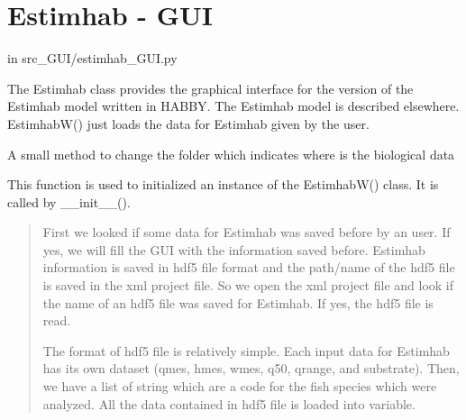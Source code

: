 \documentclass[letterpaper,10pt,english]{sphinxmanual}
\begin{document}
\section{Estimhab - GUI}
\label{\detokenize{index:estimhab-gui}}
in src\_GUI/estimhab\_GUI.py
\label{\detokenize{index:module-src_GUI.estimhab_GUI}}

\begin{fulllineitems}
\label{\detokenize{index:src_GUI.estimhab_GUI.EstimhabW}}
The Estimhab class provides the graphical interface for the version of the Estimhab model written in HABBY.
The Estimhab model is described elsewhere. EstimhabW() just loads the data for Estimhab given by the user.

\begin{fulllineitems}
\label{\detokenize{index:src_GUI.estimhab_GUI.EstimhabW.change_folder}}
A small method to change the folder which indicates where is the biological data

\end{fulllineitems}


\begin{fulllineitems}
\label{\detokenize{index:src_GUI.estimhab_GUI.EstimhabW.init_iu}}
This function is used to initialized an instance of the EstimhabW() class. It is called by \_\_init\_\_().
\begin{quote}


First we looked if some data for Estimhab was saved before by an user. If yes, we will fill the GUI with
the information saved before. Estimhab information is saved in hdf5 file format and the path/name of the
hdf5 file is saved in the xml project file. So we open the xml project file and look if the name of an hdf5
file was saved for Estimhab. If yes, the hdf5 file is read.

The format of hdf5 file is relatively simple. Each input data for Estimhab has its own dataset (qmes, hmes,
wmes, q50, qrange, and substrate).  Then, we have a list of string which are a code for the fish species which
were analyzed.  All the data contained in hdf5 file is loaded into variable.


\end{quote}
\end{fulllineitems}
\end{fulllineitems}
\end{document}
